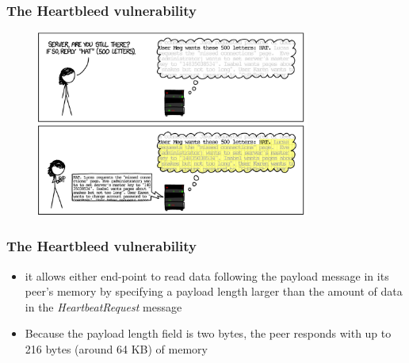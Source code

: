 \documentclass[
    11pt, %
    aspectratio=169, %
]{beamer}
\begin{document}
\begin{frame}
\label{Test Stat}
	\frametitle{The Heartbleed vulnerability}
		\begin{figure}[h!]
            \centering
            \includegraphics[angle=0, width=9cm]{xkcd.png}
            \label{Heartbleed}
        \end{figure}
\end{frame}
\begin{frame}
	\frametitle{The Heartbleed vulnerability}
            \begin{itemize}
                \item it allows either end-point to read data
following the payload message in its peer’s memory by specifying a payload length larger than the amount of data in the \emph{HeartbeatRequest} message
\newline
\newline
\newline
                \item  Because the payload length field is two bytes, the peer responds \newline with up to 216 bytes (around 64 KB) of memory
            \end{itemize}
\end{frame}
\end{document}
